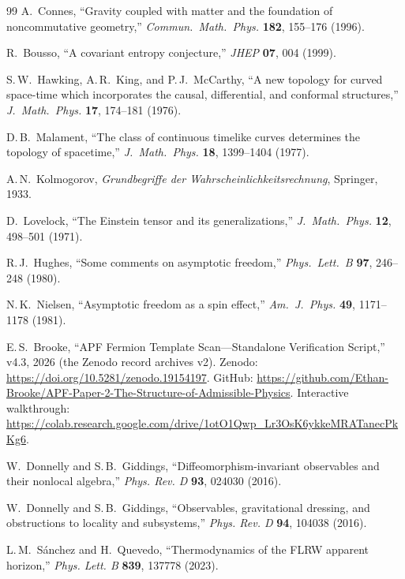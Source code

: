 \documentclass[11pt]{article}
\theoremstyle{definition}
\begin{document}
\begin{thebibliography}{99}
A.~Connes, ``Gravity coupled with matter and the foundation of
noncommutative geometry,''
\textit{Commun.\ Math.\ Phys.} \textbf{182}, 155--176 (1996).

R.~Bousso, ``A covariant entropy conjecture,''
\textit{JHEP} \textbf{07}, 004 (1999).

S.\,W.~Hawking, A.\,R.~King, and P.\,J.~McCarthy,
``A new topology for curved space-time which incorporates the causal,
differential, and conformal structures,''
\textit{J.\ Math.\ Phys.} \textbf{17}, 174--181 (1976).

D.\,B.~Malament, ``The class of continuous timelike curves determines
the topology of spacetime,''
\textit{J.\ Math.\ Phys.} \textbf{18}, 1399--1404 (1977).

A.\,N.~Kolmogorov, \textit{Grundbegriffe der Wahrscheinlichkeitsrechnung},
Springer, 1933.

D.~Lovelock, ``The Einstein tensor and its generalizations,''
\textit{J.\ Math.\ Phys.} \textbf{12}, 498--501 (1971).

R.\,J.~Hughes, ``Some comments on asymptotic freedom,''
\textit{Phys.\ Lett.\ B} \textbf{97}, 246--248 (1980).

N.\,K.~Nielsen, ``Asymptotic freedom as a spin effect,''
\textit{Am.\ J.\ Phys.} \textbf{49}, 1171--1178 (1981).

E.\,S.~Brooke, ``APF Fermion Template Scan---Standalone Verification
Script,'' v4.3, 2026 (the Zenodo record archives v2).
Zenodo: \url{https://doi.org/10.5281/zenodo.19154197}.
GitHub: \url{https://github.com/Ethan-Brooke/APF-Paper-2-The-Structure-of-Admissible-Physics}.
Interactive walkthrough:
\url{https://colab.research.google.com/drive/1otO1Qwp_Lr3OsK6ykkeMRATanecPkKg6}.

W.~Donnelly and S.\,B.~Giddings, ``Diffeomorphism-invariant observables
and their nonlocal algebra,'' \textit{Phys. Rev. D} \textbf{93}, 024030
(2016).

W.~Donnelly and S.\,B.~Giddings, ``Observables, gravitational dressing,
and obstructions to locality and subsystems,'' \textit{Phys. Rev. D}
\textbf{94}, 104038 (2016).

L.\,M.~S\'anchez and H.~Quevedo, ``Thermodynamics of the FLRW apparent
horizon,'' \textit{Phys. Lett. B} \textbf{839}, 137778 (2023).

\end{thebibliography}
\end{document}
